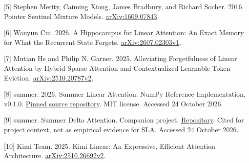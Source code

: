 \documentclass[11pt,a4paper]{article}
\begin{document}

{[}5{]} Stephen Merity, Caiming Xiong, James Bradbury, and Richard Socher. 2016. Pointer Sentinel Mixture Models. \href{https://arxiv.org/abs/1609.07843}{arXiv:1609.07843}.


{[}6{]} Wanyun Cui. 2026. A Hippocampus for Linear Attention: An Exact Memory for What the Recurrent State Forgets. \href{https://arxiv.org/abs/2607.02303v1}{arXiv:2607.02303v1}.


{[}7{]} Mutian He and Philip N. Garner. 2025. Alleviating Forgetfulness of Linear Attention by Hybrid Sparse Attention and Contextualized Learnable Token Eviction. \href{https://arxiv.org/abs/2510.20787v2}{arXiv:2510.20787v2}.


{[}8{]} summer. 2026. Summer Linear Attention: NumPy Reference Implementation, v0.1.0. \href{https://github.com/Summer110622/SummerLinearAttention/tree/036512212ed0f7d2456988cb4b523599064a7e6f}{Pinned source repository}. MIT license. Accessed 24 October 2026.


{[}9{]} summer. Summer Delta Attention. Companion project. \href{https://github.com/Summer110622/SummerDeltaAttention}{Repository}. Cited for project context, not as empirical evidence for SLA. Accessed 24 October 2026.


{[}10{]} Kimi Team. 2025. Kimi Linear: An Expressive, Efficient Attention Architecture. \href{https://arxiv.org/abs/2510.26692v2}{arXiv:2510.26692v2}.
\end{document}
